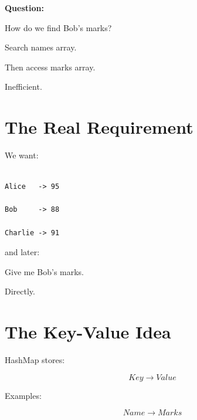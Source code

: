 \documentclass[11pt,a4paper]{book}
\begin{document}
\textbf{\textbf{Question:}}

How do we find Bob's marks?


Search names array.


Then access marks array.


Inefficient.


\section{The Real Requirement}

We want:

\begin{verbatim}

Alice   -> 95

Bob     -> 88

Charlie -> 91

\end{verbatim}


and later:


Give me Bob's marks.


Directly.


\section{The Key-Value Idea}

HashMap stores:

\[
Key
\rightarrow
Value
\]


Examples:

\[
Name
\rightarrow
Marks
\]

\end{document}
